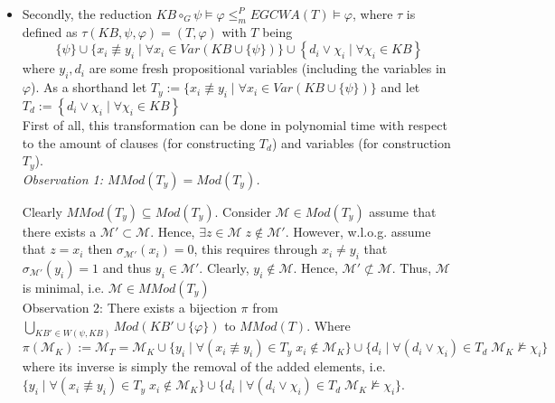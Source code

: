 \documentclass[11pt,a4paper]{article}
\newcommand{\nmodels}{\not\models}
\begin{document}
\begin{enumerate}
\begin{itemize}
\bigskip


\item Secondly, the reduction $\mathit{KB} \circ_G \psi \models \varphi     \leq_m^P \mathit{EGCWA}(T) \models \varphi $, where $\tau$ is defined as $\tau(KB, \psi, \varphi)  = (T, \varphi) $ with $T$ being 
\begin{equation*}
\{\psi\} \cup \{ x_i \not\equiv y_i  \mid \forall x_i \in \mathit{Var}(\mathit{KB}  \cup \{\psi\})\} \cup 
 \left\lbrace  d_i    \lor \chi_i  \mid \forall \chi_i \in \mathit{KB} \right\rbrace 
\end{equation*}
where $y_i, d_i$ are some fresh propositional variables (including the variables in $\varphi$).  
As a shorthand let $T_{y}:=\{ x_i \not\equiv y_i  \mid \forall x_i \in \mathit{Var}(\mathit{KB}  \cup \{\psi\})\} $ and let $T_d:=\left\lbrace  d_i   \lor \chi_i  \mid \forall \chi_i \in \mathit{KB} \right\rbrace $ \\

First of all, this transformation can be done in polynomial time with respect to the amount of clauses  (for constructing $T_d$) and variables (for construction $T_y$).  \\

\emph{Observation 1:  $\mathit{MMod}(T_y) = \mathit{Mod}(T_y)$. } 

Clearly $\mathit{MMod}(T_y) \subseteq \mathit{Mod}(T_y)$. Consider $\mathcal{M} \in \mathit{Mod}(T_y)$ assume that there exists a $\mathcal{M}' \subset \mathcal{M}$. Hence, $\exists z \in \mathcal{M}\; z \notin \mathcal{M}'$. However, w.l.o.g. assume that $z=x_i$ then $\sigma_{ \mathcal{M}'}(x_i)=0$, this requires through $x_i \neq y_i$ that $\sigma_{ \mathcal{M}'}(y_i) = 1$ and thus $y_i \in \mathcal{M}'$. 
Clearly, $y_i \notin \mathcal{M}$. Hence, $\mathcal{M}' \not\subset \mathcal{M}$. Thus, $\mathcal{M}$ is minimal, i.e. $\mathcal{M} \in \mathit{MMod}(T_y)$ \\

Observation 2: There exists a bijection $\pi$ from $\bigcup_{\mathit{KB}' \in W(\psi, \mathit{KB})} Mod(\mathit{KB}' \cup \{\varphi\})$ to $\mathit{MMod}(T)$. Where 
\begin{equation*}
\pi(\mathcal{M}_K):=\mathcal{M}_T=\mathcal{M}_K \cup \{y_i \mid \forall (x_i \not\equiv y_i) \in T_y \; x_i \notin \mathcal{M}_K\} \cup
 \{ d_i \mid \forall (d_i \lor \chi_i) \in T_d \; \mathcal{M}_K \nmodels \chi_i\}
\end{equation*}
where its inverse is simply the removal of the added elements, i.e. $ \{y_i \mid \forall (x_i \not\equiv y_i) \in T_y \; x_i \notin \mathcal{M}_K\} \cup \{ d_i \mid \forall (d_i \lor \chi_i) \in T_d \; \mathcal{M}_K \nmodels \chi_i\}$.



\end{itemize}
\end{enumerate}
\end{document}
